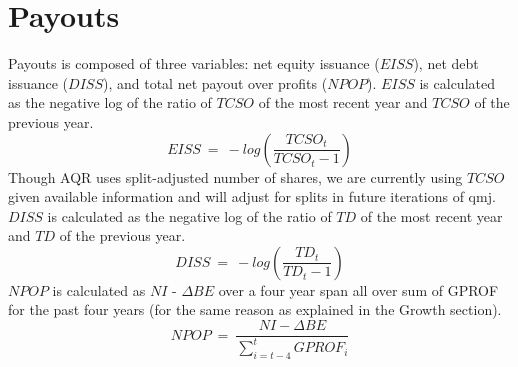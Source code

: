 \documentclass[12pt]{article}
\begin{document}
\section*{Payouts}
Payouts is composed of three variables: net equity issuance ($EISS$), net debt issuance ($DISS$), and total net payout over profits ($NPOP$). $EISS$ is calculated as the negative log of the ratio of $TCSO$ of the most recent year and $TCSO$ of the previous year. $$EISS \ = \ -log(\frac{TCSO_t}{TCSO_t-1})$$ Though AQR uses split-adjusted number of shares, we are currently using $TCSO$ given available information and will adjust for splits in future iterations of qmj. $DISS$ is calculated as the negative log of the ratio of $TD$ of the most recent year and $TD$ of the previous year. $$DISS \ = \ -log(\frac{TD_t}{TD_t-1})$$ $NPOP$ is calculated as $NI$ - $\Delta BE$ over a four year span all over sum of GPROF for the past four years (for the same reason as explained in the Growth section). $$NPOP \ = \ \frac{NI - \Delta BE}{\sum_{i=t-4}^{t}GPROF_i}$$
\end{document}
